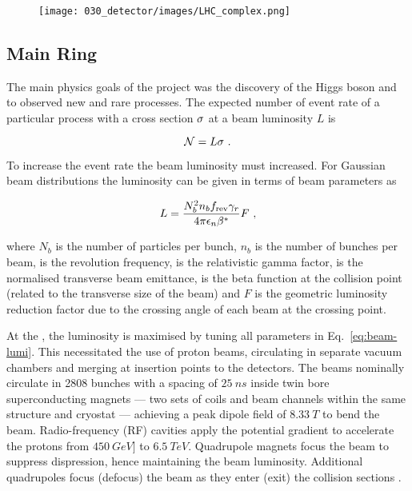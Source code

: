 \begin{figure}[!htbp]
    \centering
    \texttt{[image: 030\_detector/images/LHC\_complex.png]}
    \caption{\cite{Mobs:2197559}}
    \label{fig:LHC-Complex}
\end{figure}

\subsection{\LHC Main Ring}

The main physics goals of the \LHC project was the discovery of the Higgs boson
and to observed new and \SM rare processes. The expected number of event rate of
a particular process with a cross section $\sigma$ at a beam luminosity
$L$ is

\begin{equation}
    \mathcal{N} = L \sigma \ .
\end{equation}

To increase the event rate the beam luminosity must increased. For Gaussian
beam distributions the luminosity can be given in terms of beam parameters as

\begin{equation}
    \label{eq:beam-lumi}
    L = \frac{N_b^2 n_b\frev\relgamma}{4\pi\emitt\bstar} F\ ,
\end{equation}

where $N_b$ is the number of particles per bunch, $n_b$ is the number of bunches
per beam, \frev is the revolution frequency, \relgamma is the relativistic gamma
factor, \emitt is the normalised transverse beam emittance, \bstar is the beta
function at the collision point (related to the transverse size of the beam) and
$F$ is the geometric luminosity reduction factor due to the crossing angle of
each beam at the crossing point.

At the \LHC, the luminosity is maximised by tuning all parameters in
Eq.~\eqref{eq:beam-lumi}. This necessitated the use of proton beams, circulating
in separate vacuum chambers and merging at insertion points to the detectors.
The beams nominally circulate in 2808 bunches with a spacing of ${\SI{25}{ns}}$
inside twin bore superconducting magnets --- two sets of coils and beam channels
within the same structure and cryostat --- achieving a peak dipole field of
${\SI{8.33}{T}}$ to bend the beam. Radio-frequency (RF) cavities apply the
potential gradient to accelerate the protons from ${\SI{450}{GeV}]}$ to
${\SI{6.5}{TeV}}$. Quadrupole magnets focus the beam to suppress dispression,
hence maintaining the beam luminosity. Additional quadrupoles focus (defocus)
the beam as they enter (exit) the collision sections \cite{Bruning:782076}.

